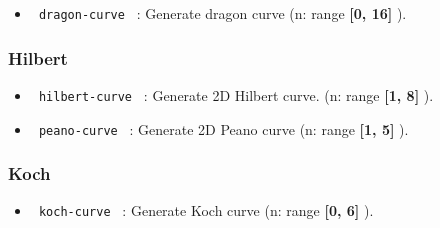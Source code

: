 \begin{itemize}
\tightlist
\item
  \texttt{\ dragon-curve\ } : Generate dragon curve (n: range
  \textbf{{[}0, 16{]}} ).
\end{itemize}

\begin{Shaded}
\begin{Highlighting}[]
\end{Highlighting}
\end{Shaded}

\subsubsection{Hilbert}\label{hilbert}

\begin{itemize}
\tightlist
\item
  \texttt{\ hilbert-curve\ } : Generate 2D Hilbert curve. (n: range
  \textbf{{[}1, 8{]}} ).
\end{itemize}

\begin{Shaded}
\begin{Highlighting}[]
\end{Highlighting}
\end{Shaded}

\begin{itemize}
\tightlist
\item
  \texttt{\ peano-curve\ } : Generate 2D Peano curve (n: range
  \textbf{{[}1, 5{]}} ).
\end{itemize}

\begin{Shaded}
\begin{Highlighting}[]
\end{Highlighting}
\end{Shaded}

\subsubsection{Koch}\label{koch}

\begin{itemize}
\tightlist
\item
  \texttt{\ koch-curve\ } : Generate Koch curve (n: range \textbf{{[}0,
  6{]}} ).
\end{itemize}

